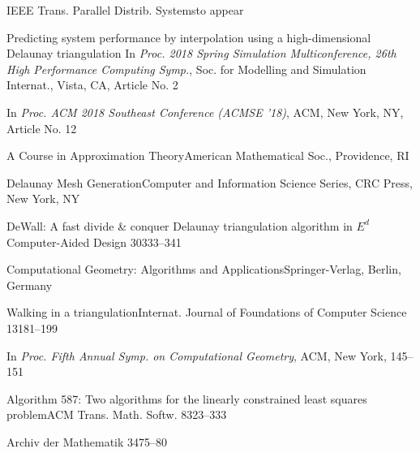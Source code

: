 {
{IEEE Trans. Parallel Distrib. Systems}{to appear}

{Predicting system performance by interpolation using a high-dimensional
Delaunay triangulation} {In {\sl Proc. 2018 Spring Simulation Multiconference,
26th High Performance Computing Symp.}, Soc. for Modelling and Simulation
Internat., Vista, CA, Article No. 2}

 {In {\sl Proc. ACM 2018 Southeast Conference
(ACMSE '18)}, ACM, New York, NY, Article No. 12}

{A Course in Approximation Theory}{American Mathematical Soc., 
Providence, RI}

{Delaunay Mesh Generation}{Computer and Information Science
Series, CRC Press, New York, NY}

{DeWall: A fast divide \& conquer Delaunay triangulation algorithm in $E^d$}
{Computer-Aided Design 30}{333--341}

{Computational Geometry: Algorithms and Applications}{Springer-Verlag,
Berlin, Germany}

{Walking in a triangulation}{Internat. Journal of Foundations of
Computer Science 13}{181--199}

 {In {\sl Proc. Fifth Annual Symp. on Computational Geometry}, 
ACM, New York, 145--151}

{Algorithm 587: Two algorithms for the linearly constrained least
squares problem}{ACM Trans. Math. Softw. 8}{323--333}

{Archiv der Mathematik 34}{75--80}

}

